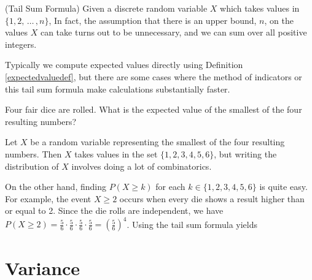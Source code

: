 \begin{prop}\label{Discrete Tail Sum Formula}(Tail Sum Formula)
Given a discrete random variable $X$ which takes values in $\{1,2,\,\dots\,,n\}$,
In fact, the assumption that there is an upper bound, $n$, on the values $X$ can take turns out to be unnecessary, and we can sum over all positive integers.
\end{prop}
\par
Typically we compute expected values directly using Definition \ref{expectedvaluedef}, but there are some cases where the method of indicators or this tail sum formula make calculations substantially faster.
\begin{examp}
Four fair dice are rolled. What is the expected value of the smallest of the four resulting numbers?
\par
\noindent Let $X$ be a random variable representing the smallest of the four resulting numbers. Then $X$ takes values in the set $\{1,2,3,4,5,6\}$, but writing the distribution of $X$ involves doing a lot of combinatorics. 
\par
\noindent On the other hand, finding $P(X \geq k)$ for each $k \in \{1,2,3,4,5,6\}$ is quite easy. For example, the event $X \geq 2$ occurs when every die shows a result higher than or equal to 2. Since the die rolls are independent, we have $P(X\geq2) = \frac{5}{6}\cdot\frac{5}{6}\cdot\frac{5}{6}\cdot \frac{5}{6} = (\frac{5}{6})^4$. Using the tail sum formula yields
\end{examp}

\section{Variance}

